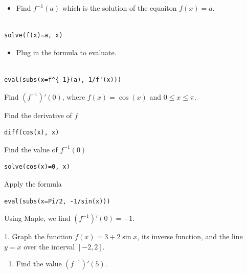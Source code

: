 \documentclass[]{book}
\providecommand{\tightlist}{%
  \setlength{\itemsep}{0pt}\setlength{\parskip}{0pt}}
\theoremstyle{definition}
\theoremstyle{definition}
\theoremstyle{definition}
\theoremstyle{remark}
\let\BeginKnitrBlock\begin \let\EndKnitrBlock\end
\begin{document}
\begin{itemize}
\tightlist
\item
  Find \(f^{-1}(a)\) which is the solution of the equaiton \(f(x)=a\).
\end{itemize}

\begin{verbatim}

solve(f(x)=a, x)
\end{verbatim}

\begin{itemize}
\tightlist
\item
  Plug in the formula to evaluate.
\end{itemize}

\begin{verbatim}

eval(subs(x=f^{-1}(a), 1/f'(x)))
\end{verbatim}

\BeginKnitrBlock{example}
\protect\hypertarget{exm:unnamed-chunk-166}{}{\label{exm:unnamed-chunk-166} }Find \((f^{-1})'(0)\), where \(f(x)=\cos(x)\) and \(0\leq x\leq \pi\).
\EndKnitrBlock{example}

\BeginKnitrBlock{solution}
{}
Find the derivative of \(f\)

\begin{verbatim}
diff(cos(x), x)
\end{verbatim}

Find the value of \(f^{-1}(0)\)

\begin{verbatim}
solve(cos(x)=0, x)
\end{verbatim}

Apply the formula

\begin{verbatim}
eval(subs(x=Pi/2, -1/sin(x)))
\end{verbatim}

Using Maple, we find \((f^{-1})'(0)=-1\).
\EndKnitrBlock{solution}

\BeginKnitrBlock{exercise}
\protect\hypertarget{exr:unnamed-chunk-168}{}{\label{exr:unnamed-chunk-168} }
1. Graph the function \(f(x)=3+2\sin x\), its inverse function, and the line \(y=x\) over the interval \([-2,2]\).

\begin{enumerate}
\def\labelenumi{\arabic{enumi}.}
\setcounter{enumi}{1}
\tightlist
\item
  Find the value \((f^{-1})'(5)\).
\end{enumerate}
\EndKnitrBlock{exercise}
\end{document}
